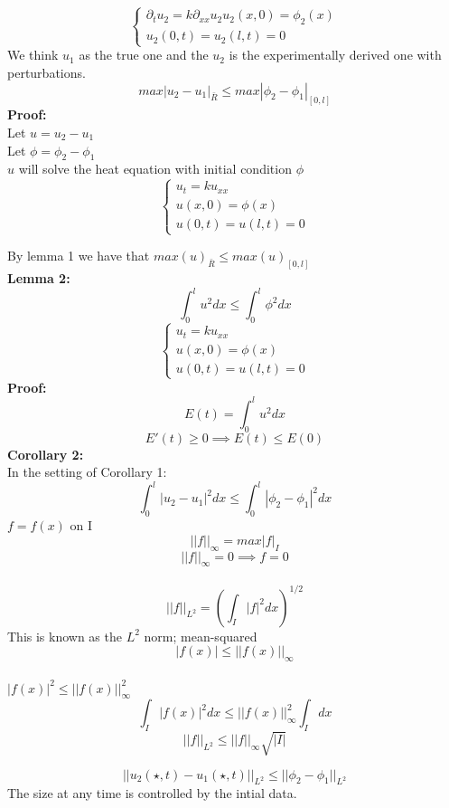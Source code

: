 \documentclass{article}
\begin{document}
$$\begin{cases}
    \partial_t u_2 = k \partial_{xx} u_2
    u_2(x,0) = \phi_2(x)\\
    u_2(0,t) = u_2(l,t) =  0
\end{cases}$$
We think $u_1$ as the true one and the $u_2$ is the experimentally derived one with perturbations.\\
$$ max |u_2 - u_1|_{\bar{R}} \leq max|\phi_2 - \phi_1|_{[0,l]}$$
\textbf{Proof:} \\
Let $u = u_2 - u_1$\\
Let $\phi = \phi_2 - \phi_1$\\
$u$ will solve the heat equation with initial condition $\phi$\\
$$\begin{cases}
    u_t = k u_{xx}\\
    u(x,0) = \phi(x)\\
    u(0,t) = u(l,t) = 0
\end{cases}
$$

By lemma 1 we have that $max(u)_{\bar{R}} \leq max(u)_{[0,l]}$\\

\textbf{Lemma 2:} \\
$$ \int_{0}^{l} u^2 dx \leq \int_{0}^{l} \phi^2 dx$$
$$
\begin{cases}
    u_t = k u_{xx}\\
    u(x,0) = \phi(x)\\
    u(0,t) = u(l,t) = 0
\end{cases}
$$
\textbf{Proof:} \\
$$ E(t) = \int_{0}^{l} u^2 dx$$
$$ E'(t) \geq 0 \implies E(t) \leq E(0)$$
\textbf{Corollary 2:} \\
In the setting of Corollary 1:\\
$$ \int_0^l |u_2 - u_1|^2 dx \leq \int_0^l |\phi_2 - \phi_1|^2 dx$$
$f = f(x)$ on I\\
$$||f||_\infty = max|f|_I$$
$$||f||_\infty = 0 \implies f = 0$$\\
$$||f||_{L^2} = \left( \int_I |f|^2 dx \right)^{1/2}$$
This is known as the $L^2$ norm; mean-squared\\
$$|f(x)| \leq ||f(x)||_\infty$$\\
$|f(x)|^2 \leq ||f(x)||_\infty^2$\\
$$\int_I |f(x)|^2 dx \leq ||f(x)||_\infty^2 \int_I dx$$
$$||f||_{L^2} \leq ||f||_\infty \sqrt{|I|}$$

$$||u_2(\star, t) - u_1(\star, t)||_{L^2} \leq ||\phi_2 - \phi_1||_{L^2}$$
The size at any time is controlled by the intial data.\\
\end{document}
